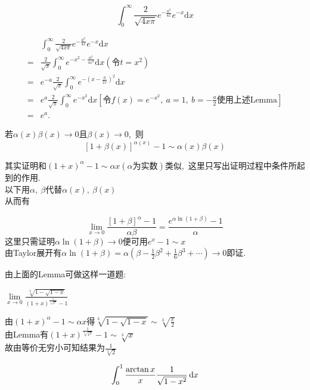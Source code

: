 	\begin{problem}
		$$\int_{0}^{\infty}\frac{2}{\sqrt{4x\pi}}e^{-\frac{a^2}{4x}}e^{-x}\text{d}x$$
	\end{problem}
	
	\begin{solution}
		\begin{align*}
			&\int_{0}^{\infty}\frac{2}{\sqrt{4x\pi}}e^{-\frac{a^2}{4x}}e^{-x}\text{d}x\\
			=&\frac{2}{\sqrt{\pi}}\int_{0}^{\infty}e^{-x^2-\frac{a^2}{4x^2}}\text{d}x\left(\text{令}t=x^2\right)\\
			=&e^{-a}\frac{2}{\sqrt{\pi}}\int_{0}^{\infty}e^{-\left(x-\frac{a}{2x}\right)^2}\text{d}x\\
			=&e^a\frac{2}{\sqrt{\pi}}\int_{0}^{\infty}e^{-x^2}\text{d}x\left[\text{令}f(x)=e^{-x^2},\ a=1,\ b=-\frac{a}{2}\text{使用上述Lemma}\right]\\
			=&e^{a}.
		\end{align*} 
	\end{solution}
	
	\newpage
	\begin{problem}
		若$\alpha(x)\beta(x)\rightarrow 0$且$\beta(x)\rightarrow 0$,\ 则$$\left[1+\beta(x)\right]^{\alpha(x)}-1\sim \alpha(x)\beta(x)$$
	\end{problem}
	
	\begin{solution}
		其实证明和$(1+x)^\alpha-1\sim \alpha x\left(\alpha\text{为实数}\right)$类似,\ 这里只写出证明过程中条件所起到的作用.\\
		以下用$\alpha,\ \beta$代替$\alpha(x),\ \beta(x)$\\
		从而有
		
		$$	\lim\limits_{x\rightarrow 0}\frac{\left[1+\beta\right]^\alpha-1}{\alpha\beta}
		=\frac{e^{\alpha\ln(1+\beta)}-1}{\alpha}$$
		$	\text{这里只需证明}\alpha\ln(1+\beta)\rightarrow0\text{便可用}e^x-1\sim x$\\
		由Taylor展开有$\alpha\ln(1+\beta)=\alpha\left(\beta-\frac{1}{2}\beta^2+\frac{1}{6}\beta^3+\cdots\right)\rightarrow 0$即证. 
	\end{solution}
	
	由上面的Lemma可做这样一道题:
	
	\begin{problem}
		$\lim\limits_{x\rightarrow 0}\frac{\sqrt[3]{1-\sqrt{1-x}}}{(1+x)^{\frac{1}{\sqrt[3]{x^2}}}-1}$
	\end{problem}
	
	\begin{solution}
		由$(1+x)^\alpha-1\sim \alpha x$得$\sqrt[3]{1-\sqrt{1-x}}\sim \sqrt[3]{\frac{x}{2}}$\\
		由Lemma有$(1+x)^{\frac{1}{\sqrt[3]{x^2}}}-1\sim \sqrt[3]{x} $\\
		故由等价无穷小可知结果为$\frac{1}{\sqrt[3]{2}}$
	\end{solution}
	\newpage
	\begin{problem}
		$$\int_{0}^{1}\frac{\arctan x}{x}\frac{1}{\sqrt{1-x^2}}\,\text d x$$
	\end{problem}
	
